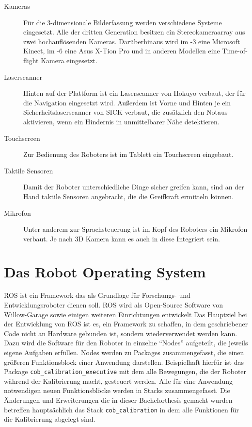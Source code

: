\begin{description}
  \item[Kameras] Für die 3-dimensionale Bilderfassung werden
    verschiedene Systeme eingesetzt. Alle \cob der dritten Generation
    besitzen ein Stereokameraarray aus zwei hochauflösenden Kameras.
    Darüberhinaus wird im -3 eine Microsoft Kinect, im -6 eine
    Asus X-Tion Pro und in anderen Modellen eine Time-of-flight Kamera
    eingesetzt. 
  \item[Laserscanner] Hinten auf der Plattform ist ein
    Laserscanner von Hokuyo verbaut, der für die Navigation eingesetzt wird.
    Außerdem ist Vorne und Hinten je ein Sicherheitslaserscanner von SICK
    verbaut, die zusätzlich den Notaus aktivieren, wenn ein Hindernis in
    unmittelbarer Nähe detektieren. 
  \item[Touchscreen] Zur Bedienung des
    Roboters ist im Tablett ein Touchscreen eingebaut. 
  \item[Taktile Sensoren]
    Damit der Roboter unterschiedliche Dinge sicher greifen kann, sind an der
    Hand taktile Sensoren angebracht, die die Greifkraft ermitteln können.
  \item[Mikrofon] Unter anderem zur Sprachsteuerung ist im Kopf des Roboters ein
    Mikrofon verbaut. Je nach 3D Kamera kann es auch in diese Integriert sein.
\end{description}

\section{Das Robot Operating System}

\ac{ROS} ist ein Framework das als Grundlage für Forschungs- und
Entwicklungsroboter dienen soll. \ac{ROS} wird als Open-Source Software von
Willow-Garage sowie einigen weiteren Einrichtungen entwickelt Das Hauptziel bei
der Entwicklung von \ac{ROS} ist es, ein Framework zu schaffen, in dem
geschriebener Code nicht an Hardware gebunden ist, sondern wiederverwendet
werden kann. Dazu wird die Software für den Roboter in einzelne ``Nodes''
aufgeteilt, die jeweils eigene Aufgaben erfüllen. Nodes werden zu Packages
zusammengefasst, die einen größeren Funktionsblock einer Anwendung
darstellen. Beispielhaft hierfür ist das Package
\texttt{cob\_calibration\_executive} mit dem alle Bewegungen, die der Roboter
während der Kalibrierung macht, gesteuert werden. Alle für eine Anwendung
notwendigen neuen Funktionsblöcke werden in Stacks zusammengefasst. Die
Änderungen und Erweiterungen die in dieser Bachelorthesis gemacht wurden
betreffen hauptsächlich das Stack \texttt{cob\_calibration} in dem alle
Funktionen für die Kalibrierung abgelegt sind. 

